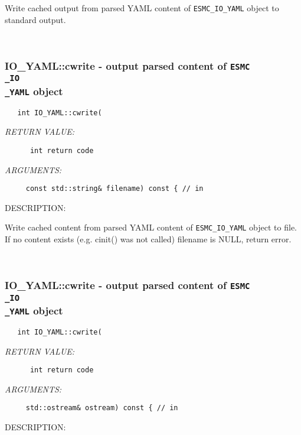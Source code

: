         Write cached output from parsed YAML content of {\tt ESMC\_IO\_YAML}
        object to standard output.
   
 
\mbox{}\hrulefill\
 
\subsubsection [IO\_YAML::cwrite] {IO\_YAML::cwrite - output parsed content of {\tt ESMC\\_IO\\_YAML} object}


  
\begin{verbatim}   int IO_YAML::cwrite(\end{verbatim}{\em RETURN VALUE:}
\begin{verbatim}      int return code\end{verbatim}{\em ARGUMENTS:}
\begin{verbatim}     const std::string& filename) const { // in
 \end{verbatim}
{\sf DESCRIPTION:\\ }


        Write cached content from parsed YAML content of {\tt ESMC\_IO\_YAML}
        object to file. If no content exists (e.g. cinit() was not called)
        filename is NULL, return error.
   
 
\mbox{}\hrulefill\
 
\subsubsection [IO\_YAML::cwrite] {IO\_YAML::cwrite - output parsed content of {\tt ESMC\\_IO\\_YAML} object}


  
\begin{verbatim}   int IO_YAML::cwrite(\end{verbatim}{\em RETURN VALUE:}
\begin{verbatim}      int return code\end{verbatim}{\em ARGUMENTS:}
\begin{verbatim}     std::ostream& ostream) const { // in
 \end{verbatim}
{\sf DESCRIPTION:\\ }


